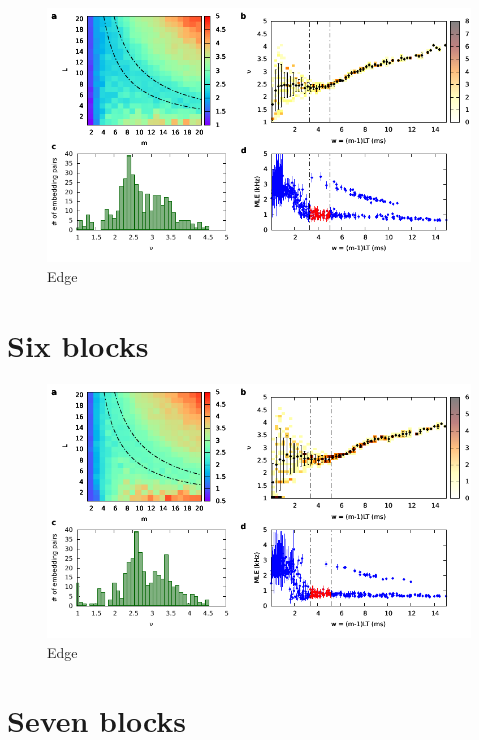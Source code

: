 \begin{figure}[H]
    \centering
    \includegraphics[width=\linewidth]{../5_blocks/edge/2e5_points/plots/chaos_low.pdf}
    \caption{Edge}
    \label{fig:5 blocks chaos}
\end{figure}

\section{Six blocks}

\begin{figure}[H]
    \centering
    \includegraphics[width=\linewidth]{../6_blocks/2e5_points/plots/chaos_low.pdf}
    \caption{Edge}
    \label{fig:6 blocks chaos}
\end{figure}

\section{Seven blocks}

